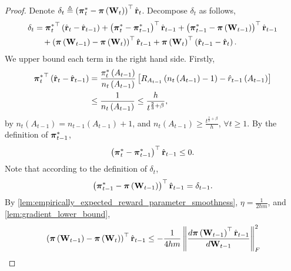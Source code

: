 \begin{proof}
    Denote $\delta_t \triangleq \left( {{\boldsymbol{\pi}}_t^*} - {\boldsymbol{\pi}}\left( {\mathbf{W}}_t \right) \right)^\top \hat{{\mathbf{r}}}_t$. Decompose $\delta_t$ as follows,
\begin{equation}
\label{eq:dynamic_regret_decomposition}
\begin{split}
    \delta_t &= {{\boldsymbol{\pi}}_t^*}^\top \left( \hat{{\mathbf{r}}}_t - \hat{{\mathbf{r}}}_{t-1}\right) + \left( {{\boldsymbol{\pi}}_t^*} - {{\boldsymbol{\pi}}_{t-1}^*} \right)^\top \hat{{\mathbf{r}}}_{t-1}  + \left( {{\boldsymbol{\pi}}_{t-1}^*} - {\boldsymbol{\pi}}\left( {\mathbf{W}}_{t-1} \right) \right)^\top \hat{{\mathbf{r}}}_{t-1} \\
    &\quad + \left(  {\boldsymbol{\pi}}\left( {\mathbf{W}}_{t-1} \right) - {\boldsymbol{\pi}}\left( {\mathbf{W}}_t \right) 
    \right)^\top \hat{{\mathbf{r}}}_{t-1} + {\boldsymbol{\pi}}\left( {\mathbf{W}}_t \right)^\top \left( \hat{{\mathbf{r}}}_{t-1} - \hat{{\mathbf{r}}}_t \right).
\end{split}
\end{equation}
We upper bound each term in the right hand side. Firstly,
\begin{equation*}
\begin{split}
    {{\boldsymbol{\pi}}_t^*}^\top \left( \hat{{\mathbf{r}}}_t - \hat{{\mathbf{r}}}_{t-1}\right) &= \frac{\pi_{t}^*\left(A_{t-1}\right)}{n_{t}\left(A_{t-1}\right)} \left[ R_{ A_{t-1}}\left( n_{t}\left(A_{t-1}\right) -1 \right) - \hat{r}_{t-1}\left(A_{t-1}\right) \right] \\
    &\le \frac{1}{n_{t}\left(A_{t-1}\right)} \le \frac{ h }{t^{\frac{2}{3} + \beta}},
\end{split}
\end{equation*}
by $n_{t}\left(A_{t-1}\right) = n_{t-1}\left(A_{t-1}\right) + 1$, and $n_{t}\left(A_{t-1}\right) \ge \frac{t^{\frac{2}{3} + \beta}}{ h }$, $\forall t \ge 1$. By the definition of ${{\boldsymbol{\pi}}_{t-1}^*}$,
\begin{equation*}
    \left( {{\boldsymbol{\pi}}_t^*} - {{\boldsymbol{\pi}}_{t-1}^*} \right)^\top \hat{{\mathbf{r}}}_{t-1} \le 0.
\end{equation*}
Note that according to the definition of $\delta_t$,
\begin{equation*}
    \left( {{\boldsymbol{\pi}}_{t-1}^*} - {\boldsymbol{\pi}}\left( {\mathbf{W}}_{t-1} \right) \right)^\top \hat{{\mathbf{r}}}_{t-1} = \delta_{t-1}.
\end{equation*}
By \cref{lem:empirically_expected_reward_parameter_smoothness}, $\eta = \frac{1}{2 h m}$, and \cref{lem:gradient_lower_bound},
\begin{equation*}
\begin{split}
    &\left( \rvpi\left( \rmW_{t-1} \right) - \rvpi\left( \rmW_t \right) \right)^\top \hat{\rvr}_{t-1} \le - \frac{1}{4 h m} \left\| \frac{d \rvpi\left( \rmW_{t-1} \right)^\top \hat{\rvr}_{t-1}}{d \rmW_{t-1}} \right\|_F^2 \\

\end{split}
\end{equation*}
\end{proof}

